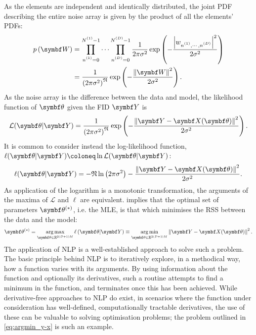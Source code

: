 As the elements are independent and identically distributed, the joint \ac{PDF}
describing the entire noise array is given by the product of all the elements'
\acp{PDF}:
\begin{equation}
    \begin{split}
        p\left(\bW\right) &=
            \prod_{\none=0}^{\None - 1}
            \cdots
            \prod_{\nD=0}^{\ND - 1}
            \frac{1}{2\pi \sigma^2}
            \exp\left(
                -\frac
                {\left\lvert \wnonenD \right\rvert^2}
                {2\sigma^2}\right) \\
            &= \frac{1}{\left(2\pi \sigma^2\right)^{\mathfrak{N}}}
            \exp\left( -\frac{\left\lVert \bW \right\rVert^2}{2\sigma^2}\right).
    \end{split}
\end{equation}
As the noise array is the difference between the data and model, the
likelihood function of $\bth$ given the \ac{FID} $\bY$ is
\begin{equation}
    \mathcal{L}(\bth \vert \bY) =
    \frac{1}{\left(2\pi \sigma^2\right)^{\mathfrak{N}}}
        \exp\left( -\frac{\left\lVert \bY - \bX(\bth) \right\rVert^2}{2\sigma^2}\right).
\end{equation}
It is common to consider instead the log-likelihood function,
$\ell(\bth \vert \bY) \coloneq \ln \mathcal{L}(\bth \vert
\bY)$:
\begin{equation}
    \ell(\bth \vert \bY) =
        -\mathfrak{N} \ln\left(2 \pi \sigma^2\right)
        -\frac{\left\lVert \bY - \bX(\bth) \right\rVert^2}{2\sigma^2}.
    \label{eq:log-likeihood}
\end{equation}
As application of the logarithm is a monotonic transformation, the
arguments of the maxima of $\mathcal{L}$ and $\ell$ are equivalent.
 implies that the optimal set of parameters
$\bth^{(*)}$, i.e. the \ac{MLE},
is that which minimises the \ac{RSS} between the data and the model:
\begin{equation}
    \bthstar = \argmax_{\bth \in \mathbb{R}^{2(D+1)M}}
        \ell\left(\bth \vert \bY\right) \equiv
        \argmin_{\bth \in \mathbb{R}^{2(D+1)M}} \left\lVert \bY - \bX(\bth) \right\rVert^2.
    \label{eq:argmin_y-x}
\end{equation}
The application of \ac{NLP} is a well-established approach to solve such a
problem\cite{Fletcher1987,Nocedal2006}. The basic principle behind \ac{NLP} is
to iteratively explore, in a methodical way, how a function varies with its
arguments. By using information about the function and optionally its
derivatives, such a routine attempts to find a minimum in the function, and
terminates once this has been achieved. While derivative-free approaches to
\ac{NLP} do exist\cite{Nelder1965,Kirkpatrick1983,Powell2009},
in scenarios where the function under consideration has well-defined,
computationally tractable derivatives, the use of these can be valuable to
solving optimisation problems; the problem outlined in
\cref{eq:argmin_y-x} is such an example.


